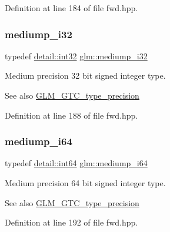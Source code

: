 Definition at line 184 of file fwd.\+hpp.

\mbox{\label{group__gtc__type__precision_ga5e00ec824eb55968a6b6496f294d8c07}} 
\subsubsection{\texorpdfstring{mediump\_i32}{mediump\_i32}}
{\footnotesize\ttfamily typedef \mbox{\hyperlink{namespaceglm_1_1detail_a9f85b4efeca416cdcec2fd08939a2e17}{detail\+::int32}} \mbox{\hyperlink{group__gtc__type__precision_ga5e00ec824eb55968a6b6496f294d8c07}{glm\+::mediump\+\_\+i32}}}

Medium precision 32 bit signed integer type. \begin{DoxySeeAlso}{See also}
\mbox{\hyperlink{group__gtc__type__precision}{G\+L\+M\+\_\+\+G\+T\+C\+\_\+type\+\_\+precision}} 
\end{DoxySeeAlso}


Definition at line 188 of file fwd.\+hpp.

\mbox{\label{group__gtc__type__precision_ga90fedf6c701ffbe00535156715e50787}} 
\subsubsection{\texorpdfstring{mediump\_i64}{mediump\_i64}}
{\footnotesize\ttfamily typedef \mbox{\hyperlink{namespaceglm_1_1detail_a5b1c3227ec636c24a0676746381adfc8}{detail\+::int64}} \mbox{\hyperlink{group__gtc__type__precision_ga90fedf6c701ffbe00535156715e50787}{glm\+::mediump\+\_\+i64}}}

Medium precision 64 bit signed integer type. \begin{DoxySeeAlso}{See also}
\mbox{\hyperlink{group__gtc__type__precision}{G\+L\+M\+\_\+\+G\+T\+C\+\_\+type\+\_\+precision}} 
\end{DoxySeeAlso}


Definition at line 192 of file fwd.\+hpp.

\mbox{\label{group__gtc__type__precision_ga28a8b5fd51072680bb55178c17cc7411}} 
